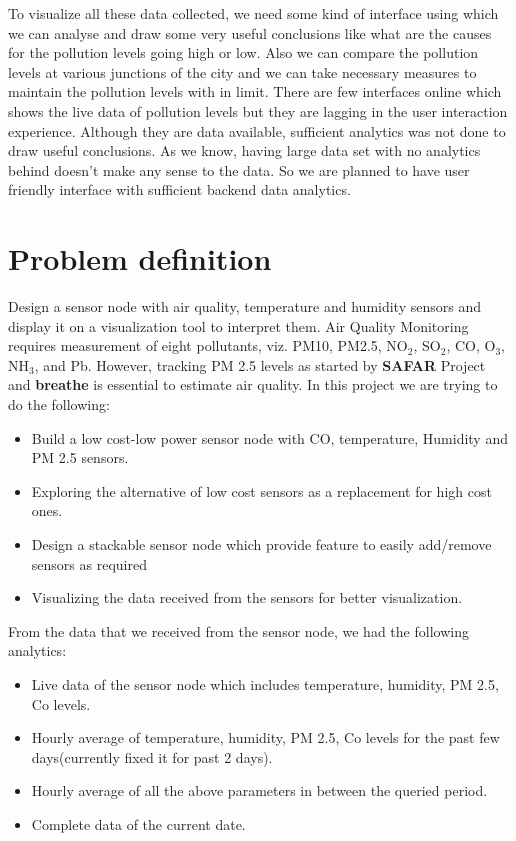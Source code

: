 \documentclass[a4paper,12pt]{article}
\begin{document}
To visualize all these data collected, we need some kind of interface using which we can analyse and draw some very useful conclusions like what are the causes for the pollution levels going high or low. Also we can compare the pollution levels at various junctions of the city and we can take necessary measures to maintain the pollution levels with in limit. There are few interfaces online which shows the live data of pollution levels but they are lagging in the user interaction experience. Although they are data available, sufficient analytics was not done to draw useful conclusions. As we know, having large data set with no analytics behind doesn't make any sense to the data. So we are planned to have user friendly interface with sufficient backend data analytics.   

\section{Problem definition}
Design a sensor node with air quality, temperature and humidity sensors and display it on a visualization tool to interpret them. Air Quality Monitoring requires measurement of eight pollutants, viz. PM10, PM2.5, NO$_2$, SO$_2$, CO, O$_3$, NH$_3$, and Pb.
However, tracking PM 2.5 levels as started by \textbf{SAFAR} Project \cite{safar} and \textbf{breathe} \cite{breathe} is essential to estimate air quality.
In this project we are trying to do the following:
\begin{itemize}
\item Build a low cost-low power sensor node with CO, temperature, Humidity and PM 2.5 sensors.
\item Exploring the alternative of low cost sensors as a replacement for high cost ones.
\item Design a stackable sensor node which provide feature to easily add/remove sensors as required  
\item Visualizing the data received from the sensors for better visualization.
\end{itemize}
From the data that we received from the sensor node, we had the following  analytics:
\begin{itemize}
\item Live data of the sensor node which includes temperature, humidity, PM 2.5, Co levels.
\item Hourly average of temperature, humidity, PM 2.5, Co levels for the past few days(currently fixed it for past 2 days).
\item Hourly average of all the above parameters in between the queried period.
\item Complete data of the current date.
\end{itemize}
\end{document}
